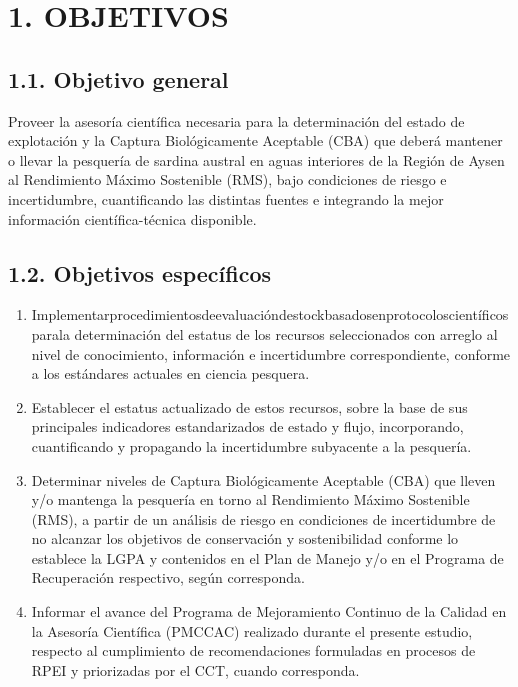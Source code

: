 \documentclass[
  spanish,
]{article}
\begin{document}
\pagebreak
\normalsize

\hypertarget{objetivos}{%
\section{1. OBJETIVOS}\label{objetivos}}

\vspace{0.8cm}

\hypertarget{objetivo-general}{%
\subsection{1.1. Objetivo general}\label{objetivo-general}}

Proveer la asesoría científica necesaria para la determinación del
estado de explotación y la Captura Biológicamente Aceptable (CBA) que
deberá mantener o llevar la pesquería de sardina austral en aguas
interiores de la Región de Aysen al Rendimiento Máximo Sostenible (RMS),
bajo condiciones de riesgo e incertidumbre, cuantificando las distintas
fuentes e integrando la mejor información científica-técnica disponible.

\vspace{0.8cm}

\hypertarget{objetivos-especuxedficos}{%
\subsection{1.2. Objetivos específicos}\label{objetivos-especuxedficos}}

\begin{enumerate}
\def\labelenumi{\arabic{enumi}.}
\item
  Implementarprocedimientosdeevaluacióndestockbasadosenprotocoloscientíficosparala
  determinación del estatus de los recursos seleccionados con arreglo al
  nivel de conocimiento, información e incertidumbre correspondiente,
  conforme a los estándares actuales en ciencia pesquera.
\item
  Establecer el estatus actualizado de estos recursos, sobre la base de
  sus principales indicadores estandarizados de estado y flujo,
  incorporando, cuantificando y propagando la incertidumbre subyacente a
  la pesquería.
\item
  Determinar niveles de Captura Biológicamente Aceptable (CBA) que
  lleven y/o mantenga la pesquería en torno al Rendimiento Máximo
  Sostenible (RMS), a partir de un análisis de riesgo en condiciones de
  incertidumbre de no alcanzar los objetivos de conservación y
  sostenibilidad conforme lo establece la LGPA y contenidos en el Plan
  de Manejo y/o en el Programa de Recuperación respectivo, según
  corresponda.
\item
  Informar el avance del Programa de Mejoramiento Continuo de la Calidad
  en la Asesoría Científica (PMCCAC) realizado durante el presente
  estudio, respecto al cumplimiento de recomendaciones formuladas en
  procesos de RPEI y priorizadas por el CCT, cuando corresponda.
\end{enumerate}
\end{document}
